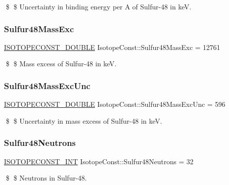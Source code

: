 \$ \$ Uncertainty in binding energy per A of Sulfur-\/48 in keV. \mbox{\label{group___isotope_const-_sulfur-_s48_ga3efaa9312093dbc25d583adc3f46dc54}} 
\subsubsection{\texorpdfstring{Sulfur48\+Mass\+Exc}{Sulfur48MassExc}}
{\footnotesize\ttfamily \mbox{\hyperlink{group___isotope_const-_macros_ga8f45a7272ce02c0b4c65c44636ed719a}{I\+S\+O\+T\+O\+P\+E\+C\+O\+N\+S\+T\+\_\+\+D\+O\+U\+B\+LE}} Isotope\+Const\+::\+Sulfur48\+Mass\+Exc = 12761}

\$ \$ Mass excess of Sulfur-\/48 in keV. \mbox{\label{group___isotope_const-_sulfur-_s48_ga7aba0126b26b6cf4102c29ba1e5e9bb3}} 
\subsubsection{\texorpdfstring{Sulfur48\+Mass\+Exc\+Unc}{Sulfur48MassExcUnc}}
{\footnotesize\ttfamily \mbox{\hyperlink{group___isotope_const-_macros_ga8f45a7272ce02c0b4c65c44636ed719a}{I\+S\+O\+T\+O\+P\+E\+C\+O\+N\+S\+T\+\_\+\+D\+O\+U\+B\+LE}} Isotope\+Const\+::\+Sulfur48\+Mass\+Exc\+Unc = 596}

\$ \$ Uncertainty in mass excess of Sulfur-\/48 in keV. \mbox{\label{group___isotope_const-_sulfur-_s48_ga9964ccf83ed658edb1267b224cb89285}} 
\subsubsection{\texorpdfstring{Sulfur48\+Neutrons}{Sulfur48Neutrons}}
{\footnotesize\ttfamily \mbox{\hyperlink{group___isotope_const-_macros_ga5f18360b3e99483a35c32d789e62621c}{I\+S\+O\+T\+O\+P\+E\+C\+O\+N\+S\+T\+\_\+\+I\+NT}} Isotope\+Const\+::\+Sulfur48\+Neutrons = 32}

\$ \$ Neutrons in Sulfur-\/48. \mbox{\label{group___isotope_const-_sulfur-_s48_gad0f72fdb7a7c3eb3681f3f7d9f3981e7}} 
